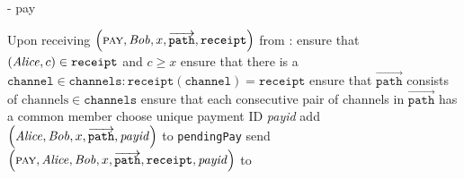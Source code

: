 \begin{systembox}{\fpaynet - pay}
  \label{alg:fpaynet:pay}
  \begin{algorithmic}[1]
    \State Upon receiving $\left(\textsc{pay}, \mathit{Bob}, x,
    \overrightarrow{\mathtt{path}}, \mathtt{receipt}\right)$ from \alice:
    \Indent
      \State ensure that $\left(\mathit{Alice}, c\right) \in \mathtt{receipt}$ and $c
      \geq x$
      \State ensure that there is a $\mathtt{channel} \in \mathtt{channels} :
      \mathtt{receipt}\left(\mathtt{channel}\right) = \mathtt{receipt}$
      \State ensure that $\overrightarrow{\mathtt{path}}$ consists of
      $\mathrm{channels} \in \mathtt{channels}$
      \State ensure that each consecutive pair of channels in
      $\overrightarrow{\mathtt{path}}$ has a common member
      \State choose unique payment ID \textit{payid}
      \State add $\left(\mathit{Alice}, \mathit{Bob}, x, \overrightarrow{\mathtt{path}},
      \mathit{payid}\right)$ to \texttt{pendingPay}
      \State send $\left(\textsc{pay}, \mathit{Alice}, \mathit{Bob}, x,
      \overrightarrow{\mathtt{path}}, \mathtt{receipt}, \mathit{payid}\right)$
      to \simulator
    \EndIndent
    \State


\end{algorithmic}
\end{systembox}

